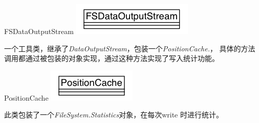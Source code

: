 \begin{XeClass}{FSDataOutputStream}
\includegraphics[width=\textwidth]{cdig/FSDataOutputStream.png}
     
 一个工具类，继承了\emph{DataOutputStream}，包装一个\emph{PositionCache.}，
 具体的方法调用都通过被包装的对象实现，通过这种方法实现了写入统计功能。

    \begin{XeInnerClass}{PositionCache}
\includegraphics[width=\textwidth]{cdig/PositionCache.png}
         
 此类包装了一个\emph{FileSystem.Statistics}对象，在每次write
 时进行统计。

    \end{XeInnerClass}
\end{XeClass}
